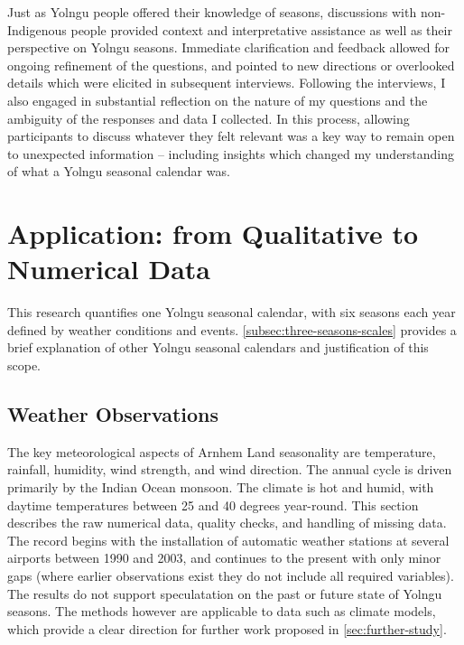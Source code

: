 Just as Yolngu people offered their knowledge of seasons, discussions with
non-Indigenous people provided context and interpretative assistance as well
as their perspective on Yolngu seasons.  Immediate clarification and
feedback allowed for ongoing refinement of the questions, and pointed to
new directions or overlooked details which were elicited in subsequent
interviews.
%
Following the interviews, I also engaged in substantial reflection on the nature
of my questions and the ambiguity of the responses and data I collected.
In this process, allowing participants to discuss whatever they felt relevant
was a key way to remain open to unexpected information -- including insights
which changed my understanding of what a Yolngu seasonal calendar was.



\section{Application: from Qualitative to Numerical Data}

This research quantifies one Yolngu seasonal calendar, with six
seasons each year defined by weather conditions and events.
\cref{subsec:three-seasons-scales} provides a brief explanation of other
Yolngu seasonal calendars and justification of this scope.

\subsection{Weather Observations}
\label{ssec:weather-methods}

The key meteorological aspects of Arnhem Land seasonality are temperature,
rainfall, humidity, wind strength, and wind direction.  The annual
cycle is driven primarily by the Indian Ocean monsoon.  The climate is hot and
humid, with daytime temperatures between 25 and 40 degrees year-round.
%
This section describes the raw numerical data, quality checks, and handling of missing data.
The record begins with the installation of automatic weather stations
at several airports between 1990 and 2003, and continues to the present with only
minor gaps (where earlier observations exist they do not include all required
variables).  The results do not support
speculatation on the past or future state of Yolngu seasons.  The methods
however are applicable to data such as climate models, which provide
a clear direction for further work proposed in \cref{sec:further-study}.

